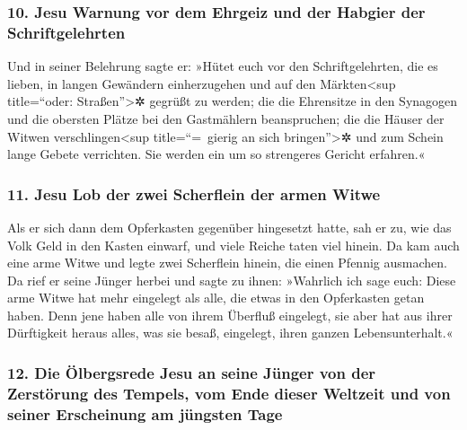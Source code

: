 \hypertarget{jesu-warnung-vor-dem-ehrgeiz-und-der-habgier-der-schriftgelehrten}{%
\subsubsection{10. Jesu Warnung vor dem Ehrgeiz und der Habgier der
Schriftgelehrten}\label{jesu-warnung-vor-dem-ehrgeiz-und-der-habgier-der-schriftgelehrten}}

 Und in seiner Belehrung sagte er: »Hütet euch vor den
Schriftgelehrten, die es lieben, in langen Gewändern einherzugehen und
auf den Märkten\textless sup title=``oder: Straßen''\textgreater✲
gegrüßt zu werden;  die die Ehrensitze in den Synagogen
und die obersten Plätze bei den Gastmählern beanspruchen;
 die die Häuser der Witwen verschlingen\textless sup
title=``=~gierig an sich bringen''\textgreater✲ und zum Schein lange
Gebete verrichten. Sie werden ein um so strengeres Gericht erfahren.«

\hypertarget{jesu-lob-der-zwei-scherflein-der-armen-witwe}{%
\subsubsection{11. Jesu Lob der zwei Scherflein der armen
Witwe}\label{jesu-lob-der-zwei-scherflein-der-armen-witwe}}

 Als er sich dann dem Opferkasten gegenüber hingesetzt
hatte, sah er zu, wie das Volk Geld in den Kasten einwarf, und viele
Reiche taten viel hinein.  Da kam auch eine arme Witwe
und legte zwei Scherflein hinein, die einen Pfennig ausmachen.
 Da rief er seine Jünger herbei und sagte zu ihnen:
»Wahrlich ich sage euch: Diese arme Witwe hat mehr eingelegt als alle,
die etwas in den Opferkasten getan haben.  Denn jene
haben alle von ihrem Überfluß eingelegt, sie aber hat aus ihrer
Dürftigkeit heraus alles, was sie besaß, eingelegt, ihren ganzen
Lebensunterhalt.«

\hypertarget{die-uxf6lbergsrede-jesu-an-seine-juxfcnger-von-der-zerstuxf6rung-des-tempels-vom-ende-dieser-weltzeit-und-von-seiner-erscheinung-am-juxfcngsten-tage}{%
\subsubsection{12. Die Ölbergsrede Jesu an seine Jünger von der
Zerstörung des Tempels, vom Ende dieser Weltzeit und von seiner
Erscheinung am jüngsten
Tage}\label{die-uxf6lbergsrede-jesu-an-seine-juxfcnger-von-der-zerstuxf6rung-des-tempels-vom-ende-dieser-weltzeit-und-von-seiner-erscheinung-am-juxfcngsten-tage}}

